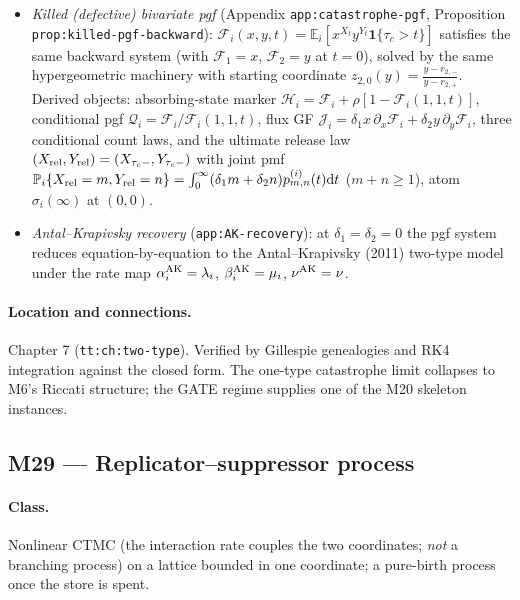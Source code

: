 \documentclass[11pt,a4paper]{article}
\newcommand{\PR}{\mathbb{P}}
\newcommand{\EX}{\mathbb{E}}
\newcommand{\dd}{\mathrm{d}}
\newcommand{\Ind}{\mathbf{1}}
\begin{document}
\begin{itemize}
  $R_0=(1-s_-)/(1-s_+)$ (Proposition \texttt{prop:delta2-zero});
  $\lambda_1=0$ linearises the type-1 equation; $\lambda_2=0$ reduces to
  Bessel functions $J_\rho,Y_\rho$ (Proposition
  \texttt{prop:lambda2-zero}); $\nu=0$ decouples into two one-type
  problems; equal rates restrict algebraically to the diagonal.
\item \emph{Killed (defective) bivariate pgf} (Appendix
  \texttt{app:catastrophe-pgf}, Proposition
  \texttt{prop:killed-pgf-backward}):
  $\mathcal F_i(x,y,t)=\EX_i[x^{X_t}y^{Y_t}\Ind\{\tau_c>t\}]$ satisfies
  the same backward system (with $\mathcal F_1=x$, $\mathcal F_2=y$ at
  $t=0$), solved by the same hypergeometric machinery with starting
  coordinate $z_{2,0}(y)=\frac{y-r_{2,-}}{y-r_{2,+}}$. Derived objects:
  absorbing-state marker $\mathcal H_i=\mathcal F_i+\rho[1-\mathcal F_i
  (1,1,t)]$, conditional pgf $\mathcal Q_i=\mathcal F_i/\mathcal F_i(1,1,t)$,
  flux GF $\mathcal J_i=\delta_1x\,\partial_x\mathcal F_i+\delta_2y\,
  \partial_y\mathcal F_i$, three conditional count laws, and the ultimate
  release law $(X_{\rm rel},Y_{\rm rel})=(X_{\tau_c-},Y_{\tau_c-})$ with
  joint pmf $\PR_i\{X_{\rm rel}=m,Y_{\rm rel}=n\}=\int_0^\infty(\delta_1m+
  \delta_2n)p^{(i)}_{m,n}(t)\dd t$ ($m+n\ge1$), atom $\sigma_i(\infty)$ at
  $(0,0)$.
\item \emph{Antal--Krapivsky recovery} (\texttt{app:AK-recovery}): at
  $\delta_1=\delta_2=0$ the pgf system reduces equation-by-equation to the
  Antal--Krapivsky (2011) two-type model under the rate map
  $\alpha^{\rm AK}_i=\lambda_i$, $\beta^{\rm AK}_i=\mu_i$,
  $\nu^{\rm AK}=\nu$.
\end{itemize}

\paragraph{Location and connections.} Chapter 7 (\texttt{tt:ch:two-type}).
Verified by Gillespie genealogies and RK4 integration against the closed
form. The one-type catastrophe limit collapses to M6's Riccati structure;
the GATE regime supplies one of the M20 skeleton instances.

\subsection{M29 --- Replicator--suppressor process}
\label{sec:M29}

\paragraph{Class.} Nonlinear CTMC (the interaction rate couples the two
coordinates; \emph{not} a branching process) on a lattice bounded in one
coordinate; a pure-birth process once the store is spent.
\end{document}
